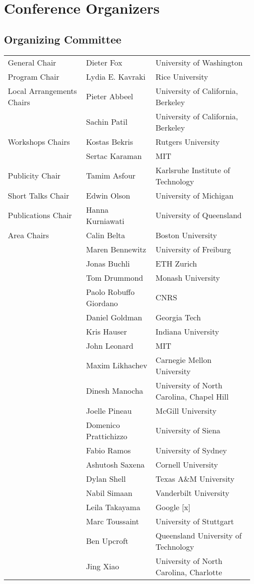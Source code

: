 \chapter{Conference Organizers}

\vspace{-1.6cm}
\section{Organizing Committee}

\begin{tabular}{>{\raggedleft}p{5cm}p{4.5cm}>{\small}p{7cm}}
General Chair & Dieter Fox & University of Washington\\
Program Chair & Lydia E. Kavraki & Rice University\\
Local Arrangements Chairs & Pieter Abbeel & University of California, Berkeley\\
& Sachin Patil & University of California, Berkeley\\
Workshops Chairs & Kostas Bekris & Rutgers University\\
& Sertac Karaman & MIT\\
Publicity Chair & Tamim Asfour & Karlsruhe Institute of Technology\\
Short Talks Chair & Edwin Olson & University of Michigan\\
Publications Chair & Hanna Kurniawati & University of Queensland\\[5mm]

Area Chairs & Calin Belta & Boston University\\
& Maren Bennewitz & University of Freiburg\\
& Jonas Buchli & ETH Zurich\\
& Tom Drummond & Monash University\\
& Paolo Robuffo Giordano & CNRS \\
& Daniel Goldman & Georgia Tech \\
& Kris Hauser & Indiana University \\
& John Leonard & MIT \\
& Maxim Likhachev & Carnegie Mellon University \\
& Dinesh Manocha & University of North Carolina, Chapel Hill\\
& Joelle Pineau & McGill University \\
& Domenico Prattichizzo & University of Siena \\
& Fabio Ramos & University of Sydney \\
& Ashutosh Saxena & Cornell University \\
& Dylan Shell & Texas A\&M University \\
& Nabil Simaan & Vanderbilt University \\
& Leila Takayama & Google [x] \\
& Marc Toussaint & University of Stuttgart \\
& Ben Upcroft & Queensland University of Technology \\
& Jing Xiao & University of North Carolina, Charlotte\\[5mm]


\end{tabular}

